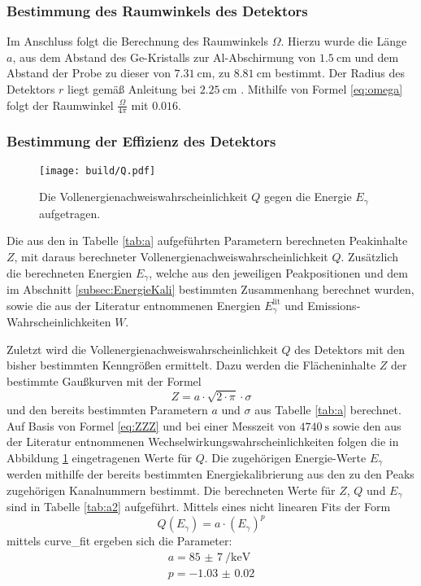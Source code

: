\subsubsection{Bestimmung des Raumwinkels des Detektors}
Im Anschluss folgt die Berechnung des Raumwinkels $\Omega$. Hierzu wurde die Länge $a$, aus dem Abstand des Ge-Kristalls zur Al-Abschirmung von $\SI{1.5}{\centi\meter}$ und dem Abstand der Probe zu dieser von $\SI{7.31}{\centi\meter}$, zu $\SI{8.81}{\centi\meter}$ bestimmt. Der Radius des Detektors $r$ liegt gemäß Anleitung bei $\SI{2.25}{\centi\meter}$ \cite{V18}. Mithilfe von Formel \eqref{eq:omega} folgt der Raumwinkel $\frac{\Omega}{4 \pi}$ mit $\num{0.016}$.


\subsubsection{Bestimmung der Effizienz des Detektors}
\begin{figure}
	\centering
	\texttt{[image: build/Q.pdf]}
	\caption{Die Vollenergienachweiswahrscheinlichkeit $Q$ gegen die Energie $E_\gamma$ aufgetragen.}
	\label{fig:Q}
\end{figure}
\begin{table}
	\centering
	\caption{Die aus den in Tabelle \ref{tab:a} aufgeführten Parametern berechneten Peakinhalte $Z$, mit daraus berechneter Vollenergienachweiswahrscheinlichkeit $Q$. Zusätzlich die berechneten Energien $E_\gamma$, welche aus den jeweiligen Peakpositionen und dem im Abschnitt \ref{subsec:EnergieKali} bestimmten Zusammenhang berechnet wurden, sowie die aus der Literatur entnommenen Energien $E_\gamma^\text{lit}$ und Emissions-Wahrscheinlichkeiten $W$.}
	
\end{table}
Zuletzt wird die Vollenergienachweiswahrscheinlichkeit $Q$ des Detektors mit den bisher bestimmten Kenngrößen ermittelt. Dazu werden die Flächeninhalte $Z$ der bestimmte Gaußkurven mit der Formel 
\begin{equation}
    Z = a \cdot \sqrt{2 \cdot \pi} \cdot \sigma \label{eq:flach}
\end{equation}
und den bereits bestimmten Parametern $a$ und $\sigma$ aus Tabelle \ref{tab:a} berechnet. Auf Basis von Formel \eqref{eq:ZZZ} und bei einer Messzeit von $\SI{4740}{\second}$ sowie den aus der Literatur entnommenen Wechselwirkungswahrscheinlichkeiten \cite{MARTIN20131497} folgen die in Abbildung \ref{fig:Q} eingetragenen Werte für $Q$. Die zugehörigen Energie-Werte $E_\gamma$ werden mithilfe der bereits bestimmten Energiekalibrierung aus den zu den Peaks zugehörigen Kanalnummern bestimmt. Die berechneten Werte für $Z$, $Q$ und $E_\gamma$ sind in Tabelle \ref{tab:a2} aufgeführt. Mittels eines nicht linearen Fits der Form 
\begin{equation}
	Q(E_\gamma)=a \cdot (E_\gamma)^p
\end{equation}
mittels curve\_fit \cite{scipy} ergeben sich die Parameter:
\begin{gather*}
    a = \SI{85(7)}{\per\kilo\electronvolt}\\
    p = \num{-1.03(2)}
\end{gather*}


